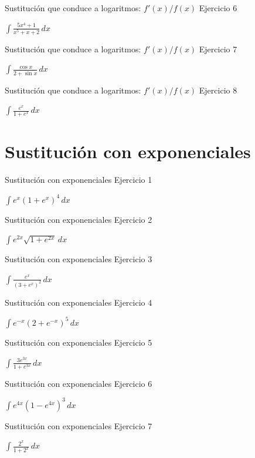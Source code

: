 \documentclass[10pt,aspectratio=169]{beamer}
\newcommand{\ejercicio}[1]{%
  \begin{center}
  \vfill
  {\fontsize{24}{30}\selectfont #1}
  \vfill
  \end{center}
}
\begin{document}
\begin{frame}{Sustitución que conduce a logaritmos: $f'(x)/f(x)$}
\small Ejercicio 6
\ejercicio{$\displaystyle \int\frac{5x^4+1}{x^5+x+2}\,dx$}
\end{frame}

\begin{frame}{Sustitución que conduce a logaritmos: $f'(x)/f(x)$}
\small Ejercicio 7
\ejercicio{$\displaystyle \int\frac{\cos x}{2+\sin x}\,dx$}
\end{frame}

\begin{frame}{Sustitución que conduce a logaritmos: $f'(x)/f(x)$}
\small Ejercicio 8
\ejercicio{$\displaystyle \int\frac{e^x}{1+e^x}\,dx$}
\end{frame}

\section{Sustitución con exponenciales}
\begin{frame}{Sustitución con exponenciales}
\small Ejercicio 1
\ejercicio{$\displaystyle \int e^x(1+e^x)^4\,dx$}
\end{frame}

\begin{frame}{Sustitución con exponenciales}
\small Ejercicio 2
\ejercicio{$\displaystyle \int e^{2x}\sqrt{1+e^{2x}}\,dx$}
\end{frame}

\begin{frame}{Sustitución con exponenciales}
\small Ejercicio 3
\ejercicio{$\displaystyle \int\frac{e^x}{(3+e^x)^2}\,dx$}
\end{frame}

\begin{frame}{Sustitución con exponenciales}
\small Ejercicio 4
\ejercicio{$\displaystyle \int e^{-x}(2+e^{-x})^5\,dx$}
\end{frame}

\begin{frame}{Sustitución con exponenciales}
\small Ejercicio 5
\ejercicio{$\displaystyle \int\frac{3e^{3x}}{1+e^{3x}}\,dx$}
\end{frame}

\begin{frame}{Sustitución con exponenciales}
\small Ejercicio 6
\ejercicio{$\displaystyle \int e^{4x}(1-e^{4x})^3\,dx$}
\end{frame}

\begin{frame}{Sustitución con exponenciales}
\small Ejercicio 7
\ejercicio{$\displaystyle \int\frac{2^x}{1+2^x}\,dx$}
\end{frame}
\end{document}
